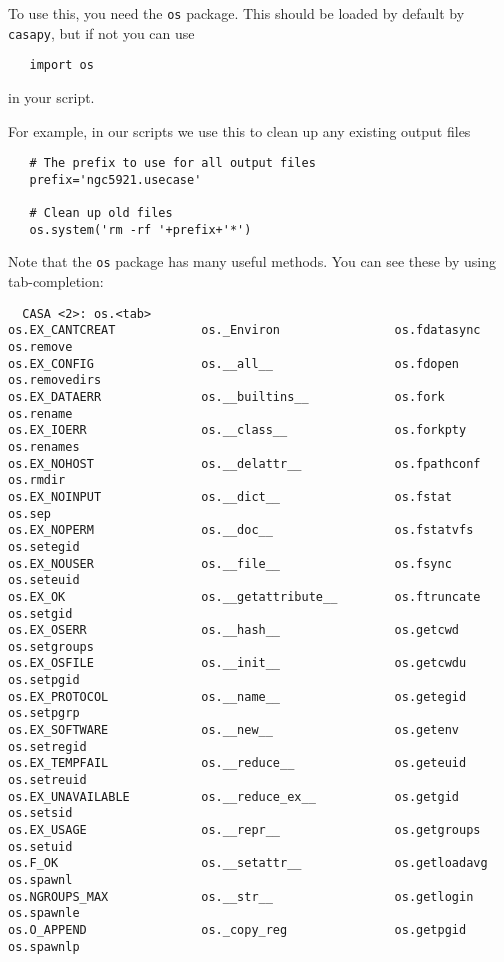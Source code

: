 To use this, you need the {\tt os} package.  This should be loaded
by default by {\tt casapy}, but if not you can use
\small
\begin{verbatim}
   import os
\end{verbatim}
\normalsize
in your script.

For example, in our scripts we use this to clean up any existing
output files
\small
\begin{verbatim}
   # The prefix to use for all output files
   prefix='ngc5921.usecase'

   # Clean up old files
   os.system('rm -rf '+prefix+'*')
\end{verbatim}
\normalsize

Note that the {\tt os} package has many useful methods.  You can
see these by using tab-completion:
\small
\begin{verbatim}
  CASA <2>: os.<tab>
os.EX_CANTCREAT            os._Environ                os.fdatasync               os.remove
os.EX_CONFIG               os.__all__                 os.fdopen                  os.removedirs
os.EX_DATAERR              os.__builtins__            os.fork                    os.rename
os.EX_IOERR                os.__class__               os.forkpty                 os.renames
os.EX_NOHOST               os.__delattr__             os.fpathconf               os.rmdir
os.EX_NOINPUT              os.__dict__                os.fstat                   os.sep
os.EX_NOPERM               os.__doc__                 os.fstatvfs                os.setegid
os.EX_NOUSER               os.__file__                os.fsync                   os.seteuid
os.EX_OK                   os.__getattribute__        os.ftruncate               os.setgid
os.EX_OSERR                os.__hash__                os.getcwd                  os.setgroups
os.EX_OSFILE               os.__init__                os.getcwdu                 os.setpgid
os.EX_PROTOCOL             os.__name__                os.getegid                 os.setpgrp
os.EX_SOFTWARE             os.__new__                 os.getenv                  os.setregid
os.EX_TEMPFAIL             os.__reduce__              os.geteuid                 os.setreuid
os.EX_UNAVAILABLE          os.__reduce_ex__           os.getgid                  os.setsid
os.EX_USAGE                os.__repr__                os.getgroups               os.setuid
os.F_OK                    os.__setattr__             os.getloadavg              os.spawnl
os.NGROUPS_MAX             os.__str__                 os.getlogin                os.spawnle
os.O_APPEND                os._copy_reg               os.getpgid                 os.spawnlp

\end{verbatim}
